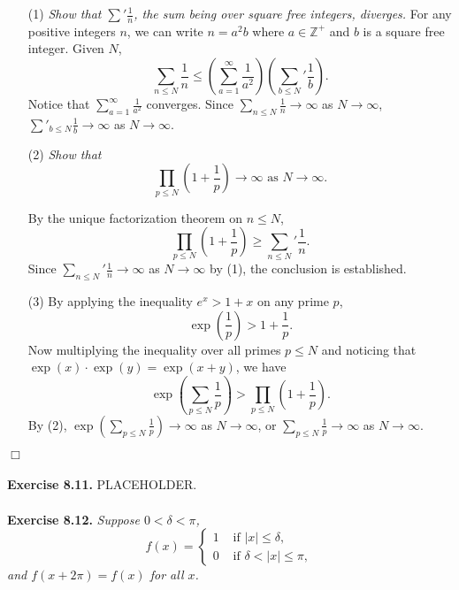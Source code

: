 \documentclass{article}
\begin{document}
\begin{enumerate}
\item[(1)]
\emph{Show that ${\sum}' \frac{1}{n}$, the sum being over square free integers, diverges.}
For any positive integers $n$, we can write $n = a^2 b$ where $a \in \mathbb{Z}^+$ and
$b$ is a square free integer.
Given $N$,
$$\sum_{n \leq N} \frac{1}{n}
\leq \left(\sum_{a = 1}^{\infty} \frac{1}{a^2} \right)
\left( {\sum_{b \leq N}}' \frac{1}{b} \right).$$
Notice that $\sum_{a = 1}^{\infty} \frac{1}{a^2}$ converges.
Since $\sum_{n \leq N} \frac{1}{n} \rightarrow \infty$ as $N \rightarrow \infty$,
$\sum'_{b \leq N}\frac{1}{b} \rightarrow \infty$ as $N \rightarrow \infty$.

\item[(2)]
\emph{Show that
\[
  \prod_{p \leq N} ( 1 + \frac{1}{p} ) \rightarrow \infty \text{ as } N \rightarrow \infty.
\]}

By the unique factorization theorem on $n \leq N$,
$$\prod_{p \leq N} \left( 1 + \frac{1}{p} \right)
\geq {\sum_{n \leq N}}' \frac{1}{n}.$$
Since ${\sum_{n \leq N}}' \frac{1}{n} \rightarrow \infty$ as $N \rightarrow \infty$ by (1),
the conclusion is established.

\item[(3)]
By applying the inequality $e^x > 1 + x$ on any prime $p$,
$$\exp\left(\frac{1}{p}\right) > 1 + \frac{1}{p}.$$
Now multiplying the inequality over all primes $p \leq N$ and noticing that
$\exp(x) \cdot \exp(y) = \exp(x + y)$, we have
$$\exp\left(\sum_{p \leq N} \frac{1}{p} \right)
> \prod_{p \leq N} \left( 1 + \frac{1}{p} \right).$$
By (2),
$\exp\left(\sum_{p \leq N} \frac{1}{p} \right) \rightarrow \infty$ as $N \rightarrow \infty$, or
$\sum_{p \leq N} \frac{1}{p} \rightarrow \infty$ as $N \rightarrow \infty$.
\end{enumerate}
$\Box$ \\\\






\textbf{Exercise 8.11.}
PLACEHOLDER. \\\\






\textbf{Exercise 8.12.}
\emph{Suppose $0 < \delta < \pi$,
\begin{equation*}
  f(x) =
    \begin{cases}
      1 & \text{ if } |x| \leq \delta, \\
      0 & \text{ if } \delta < |x| \leq \pi,
    \end{cases}
\end{equation*}
and $f(x + 2\pi) = f(x)$ for all $x$.}
\end{document}
